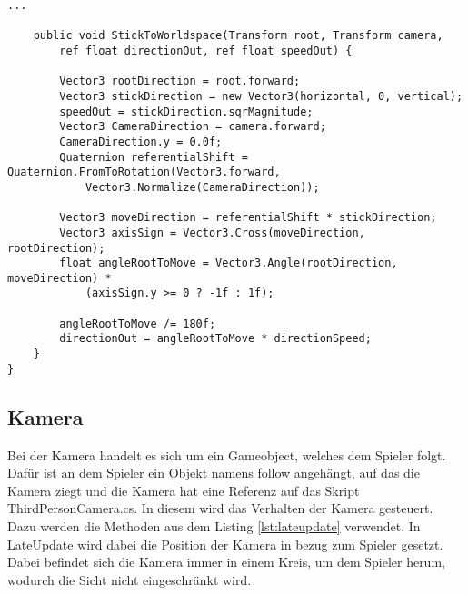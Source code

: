 \begin{scriptsize}
\begin{lstlisting}[label=lst:c_charactercontroller]
    ...

    public void StickToWorldspace(Transform root, Transform camera, 
    	ref float directionOut, ref float speedOut) {
    	
        Vector3 rootDirection = root.forward;
        Vector3 stickDirection = new Vector3(horizontal, 0, vertical);
        speedOut = stickDirection.sqrMagnitude;
        Vector3 CameraDirection = camera.forward;
        CameraDirection.y = 0.0f;
        Quaternion referentialShift = Quaternion.FromToRotation(Vector3.forward, 
        	Vector3.Normalize(CameraDirection));
        	
        Vector3 moveDirection = referentialShift * stickDirection;
        Vector3 axisSign = Vector3.Cross(moveDirection, rootDirection);
        float angleRootToMove = Vector3.Angle(rootDirection, moveDirection) * 
        	(axisSign.y >= 0 ? -1f : 1f);      
        	
        angleRootToMove /= 180f;
        directionOut = angleRootToMove * directionSpeed;
    }
}

\end{lstlisting}
\end{scriptsize}

\subsection{Kamera}

Bei der Kamera handelt es sich um ein Gameobject, welches dem Spieler folgt. Dafür ist an dem Spieler ein Objekt namens follow angehängt, auf das die Kamera ziegt und die Kamera hat eine Referenz auf das Skript ThirdPersonCamera.cs. In diesem wird das Verhalten der Kamera gesteuert. Dazu werden die Methoden aus dem Listing \ref{lst:lateupdate} verwendet. In LateUpdate wird dabei die Position der Kamera in bezug zum Spieler gesetzt. Dabei befindet sich die Kamera immer in einem Kreis, um dem Spieler herum, wodurch die Sicht nicht eingeschränkt wird.


